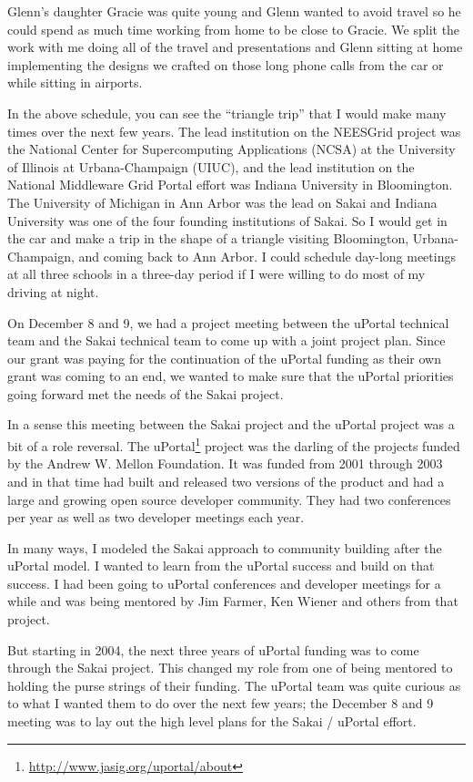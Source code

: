\documentclass[12pt]{book}
\begin{document}
Glenn's daughter Gracie was quite young and Glenn wanted to avoid travel
so he could spend as much time working from home to be close to Gracie.  We split the work
with me doing all of the travel and presentations and Glenn sitting at home
implementing the designs we crafted on those long phone calls from the car or
while sitting in airports.

In the above schedule, you can see the ``triangle trip'' that I would make many times
over the next few years.  The lead institution on the NEESGrid project was the
National Center for Supercomputing Applications (NCSA) at
the University of Illinois at Urbana-Champaign (UIUC), and the lead institution on the
National Middleware Grid Portal effort was Indiana University in Bloomington.
The University of Michigan in Ann Arbor was the lead on Sakai and
Indiana University was one of the four founding institutions of Sakai.  So I would
get in the car and make a trip in the shape of a triangle visiting Bloomington,
Urbana-Champaign, and coming back to Ann Arbor.  I could schedule day-long meetings
at all three schools in a three-day period if I were willing to do most of my
driving at night.

On December 8 and 9, we had a project meeting between the uPortal technical team and
the Sakai technical team to come up with a joint project plan.  Since our grant was
paying for the continuation of the uPortal funding as their own grant was coming to
an end, we wanted to make sure that the uPortal priorities going forward
met the needs of the Sakai project.

In a sense this meeting between the Sakai project and the uPortal project was a bit
of a role reversal.  The uPortal\footnote{\url{http://www.jasig.org/uportal/about}}
project was the darling of the projects funded
by the Andrew W. Mellon Foundation.  It was funded from 2001 through 2003 and in that
time had built and released two versions of the product and had a large and growing
open source developer community. They had two conferences per year as well as two developer
meetings each year.

In many ways, I modeled the Sakai approach to community building after the uPortal model.
I wanted to learn from the uPortal success and build on that success.   I had been
going to uPortal conferences and developer meetings for a while and was being mentored
by Jim Farmer, Ken Wiener and others from that project.

But starting in 2004,
the next three years of uPortal funding was to come through the Sakai project.
This changed my role from one of being mentored to holding the purse strings
of their funding.   The uPortal team was quite curious as to what I wanted
them to do over the next few years;  the December 8 and 9 meeting was to lay out
the high level plans for the Sakai / uPortal effort.
\end{document}
